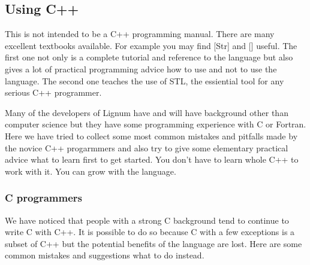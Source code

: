 \subsection{Using C++}

This is not  intended to be a C++ programming  manual.  There are many
excellent textbooks available.  For example  you may find [Str] and []
useful. The first one not only is a complete tutorial and reference to
the language but also gives  a lot of practical programming advice how
to use and not to use the  language. The second one teaches the use of
STL, the essiential tool for any serious C++ programmer.

Many of the  developers of Lignum have and  will have background other
than computer science but they have some programming experience with C
or Fortran.  Here  we have tried to collect  some most common mistakes
and pitfalls made  by the novice C++ progarmmers and  also try to give
some elementary practical  advice what to learn first  to get started.
You don't have to  learn whole C++ to work with it.  You can grow with
the language.

\subsubsection{C programmers}

We  have  noticed that  people  with a  strong  C  background tend  to
continue to write C with C++. It is possible to do so because C with a
few exceptions  is a subset of  C++ but the potential  benefits of the
language are lost.  Here are some common mistakes and suggestions what
to do instead.

